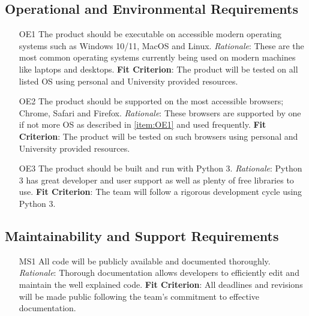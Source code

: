 \documentclass[12pt, titlepage]{article}
\makeatletter
\def\itemlabel#1#2{\def\@currentlabel{#2}\phantomsection\label{#1}}
\makeatother
\begin{document}
\subsection{Operational and Environmental Requirements}
\begin{itemize}

    \item [OE1] \itemlabel{item:OE1}{OE1} The product should be executable on accessible modern operating systems such as Windows 10/11, MacOS and Linux.
    {\newline \emph{Rationale}: These are the most common operating systems currently being used on modern machines like laptops and desktops.
	\newline \textbf{Fit Criterion}: The product will be tested on all listed OS using personal and University provided resources.}
	
	\item [OE2] The product should be supported on the most accessible browsers; Chrome, Safari and Firefox.
	{\newline \emph{Rationale}:  These browsers are supported by one if not more OS as described in \ref{item:OE1} and used frequently.
	\newline \textbf{Fit Criterion}: The product will be tested on such browsers using personal and University provided resources.}
	
	\item [OE3] The product should be built and run with Python 3.
	{\newline \emph{Rationale}: Python 3 has great developer and user support as well as plenty of free libraries to use.
	\newline \textbf{Fit Criterion}: The team will follow a rigorous development cycle using Python 3.}
\end{itemize}	
	
\subsection{Maintainability and Support Requirements}
\begin{itemize}
    \item [MS1] All code will be publicly available and documented thoroughly.
	{\newline \emph{Rationale}: Thorough documentation allows developers to efficiently edit and maintain the well explained code.
	\newline \textbf{Fit Criterion}: All deadlines and revisions will be made public following the team's commitment to effective documentation.}
	
\end{itemize}
\end{document}
